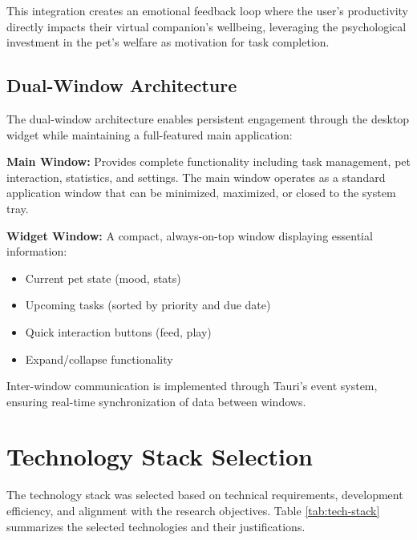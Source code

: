 This integration creates an emotional feedback loop where the user's productivity directly impacts their virtual companion's wellbeing, leveraging the psychological investment in the pet's welfare as motivation for task completion.

\subsection{Dual-Window Architecture}

The dual-window architecture enables persistent engagement through the desktop widget while maintaining a full-featured main application:

\textbf{Main Window:} Provides complete functionality including task management, pet interaction, statistics, and settings. The main window operates as a standard application window that can be minimized, maximized, or closed to the system tray.

\textbf{Widget Window:} A compact, always-on-top window displaying essential information:
\begin{itemize}
    \item Current pet state (mood, stats)
    \item Upcoming tasks (sorted by priority and due date)
    \item Quick interaction buttons (feed, play)
    \item Expand/collapse functionality
\end{itemize}

Inter-window communication is implemented through Tauri's event system, ensuring real-time synchronization of data between windows.

\section{Technology Stack Selection}
\label{sec:technology-stack}

\completed

The technology stack was selected based on technical requirements, development efficiency, and alignment with the research objectives. Table \ref{tab:tech-stack} summarizes the selected technologies and their justifications.

